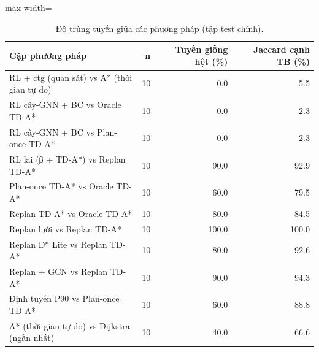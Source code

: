 \begin{table}[!htbp]
\centering
\small
\caption{Độ trùng tuyến giữa các phương pháp (tập test chính).}
\label{tab:tab_route_overlap}
\begin{adjustbox}{max width=\linewidth}
\begin{tabular}{lrrr}
\toprule
Cặp phương pháp & n & Tuyến giống hệt (\%) & Jaccard cạnh TB (\%) \\
\midrule
RL + ctg (quan sát) vs A* (thời gian tự do) & 10 & 0.0 & 5.5 \\
RL cây-GNN + BC vs Oracle TD-A* & 10 & 0.0 & 2.3 \\
RL cây-GNN + BC vs Plan-once TD-A* & 10 & 0.0 & 2.3 \\
RL lai (β + TD-A*) vs Replan TD-A* & 10 & 90.0 & 92.9 \\
Plan-once TD-A* vs Oracle TD-A* & 10 & 60.0 & 79.5 \\
Replan TD-A* vs Oracle TD-A* & 10 & 80.0 & 84.5 \\
Replan lười vs Replan TD-A* & 10 & 100.0 & 100.0 \\
Replan D* Lite vs Replan TD-A* & 10 & 80.0 & 92.6 \\
Replan + GCN vs Replan TD-A* & 10 & 90.0 & 94.3 \\
Định tuyến P90 vs Plan-once TD-A* & 10 & 60.0 & 88.8 \\
A* (thời gian tự do) vs Dijkstra (ngắn nhất) & 10 & 40.0 & 66.6 \\
\bottomrule
\end{tabular}
\end{adjustbox}
\end{table}
